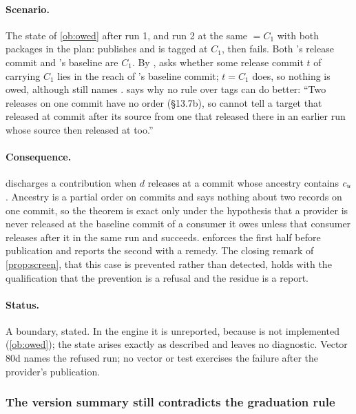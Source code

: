 \paragraph{Scenario.} The state of \cref{ob:owed} after run 1, and run 2 at
the same \Head{} $= C_1$ with both packages in the plan: 
publishes and is tagged at $C_1$, then  fails. Both
's release commit and 's baseline are $C_1$. By
,  asks whether some release
commit $t$ of  carrying $C_1$ lies in the reach of 's
baseline commit; $t = C_1$ does, so nothing is owed, although 
still names .  says why no rule over tags can do
better: ``Two releases on one commit have no order (\S13.7b), so
 cannot tell a target that released at commit  after
its source from one that released there in an earlier run whose source then
released at  too.''

\paragraph{Consequence.}  discharges a contribution when $d$
releases at a commit whose ancestry contains $c_{u}$. Ancestry is a partial
order on commits and says nothing about two records on one commit, so the
theorem is exact only under the hypothesis that a provider is never released
at the baseline commit of a consumer it owes unless that consumer releases
after it in the same run and succeeds.  enforces the first half
before publication and reports the second with a remedy. The closing remark
of \cref{prop:screen}, that this case is prevented rather than detected,
holds with the qualification that the prevention is a refusal and the
residue is a report.

\paragraph{Status.} A boundary, stated. In the engine it is unreported,
because  is not implemented (\cref{ob:owed}); the state arises
exactly as described and leaves no diagnostic. Vector 80d names the refused
run; no vector or test exercises the failure after the provider's
publication.

\subsubsection{The version summary still contradicts the graduation rule}

